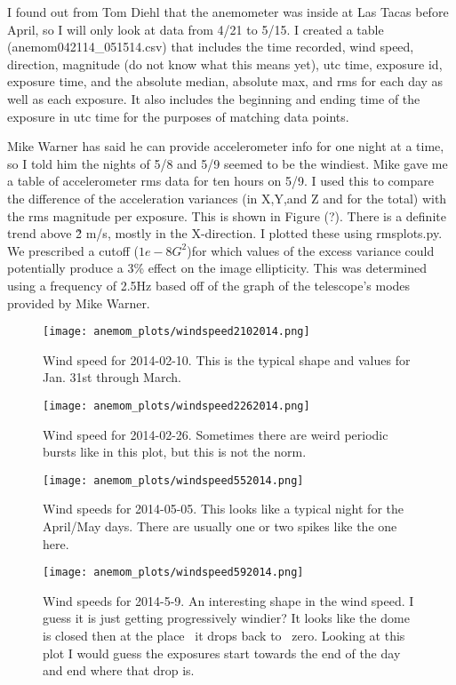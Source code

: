 \documentclass{article}
\begin{document}
I found out from Tom Diehl that the anemometer was inside at Las Tacas before April, so I will only look at data from 4/21 to 5/15. 
I created a table (anemom042114\_051514.csv) that includes the time recorded, wind speed, direction, magnitude (do not know what this means yet), utc time, exposure id, exposure time, and the absolute median, absolute max, and rms for each day as well as each exposure.
 It also includes the beginning and ending time of the exposure in utc time for the purposes of matching data points.

Mike Warner has said he can provide accelerometer info for one night at a time, so I told him the nights of 5/8 and 5/9 seemed to be the windiest. 
Mike gave me a table of accelerometer rms data for ten hours on 5/9. 
I used this to compare the difference of the acceleration variances (in X,Y,and Z and for the total) with the rms magnitude per exposure. 
This is shown in Figure (?). 
There is a definite trend above \~2 m/s, mostly in the X-direction. 
I plotted these using rmsplots.py. 
We prescribed a cutoff ($1e-8 G^{2}$)for which values of the excess variance could potentially produce a 3\% effect on the image ellipticity. 
This was determined using a frequency of 2.5Hz based off of the graph of the telescope's modes provided by Mike Warner.


\begin{figure}[h!]
  \centering
  \texttt{[image: anemom\_plots/windspeed2102014.png]}
  \caption{Wind speed for 2014-02-10. This is the typical shape and values for Jan. 31st through March.}
\end{figure}

\begin{figure}[h!]
  \centering
  \texttt{[image: anemom\_plots/windspeed2262014.png]}
  \caption{Wind speed for 2014-02-26. Sometimes there are weird periodic bursts like in this plot, but this is not the norm.}
\end{figure}

\begin{figure}[h!]
  \centering
  \texttt{[image: anemom\_plots/windspeed552014.png]}
  \caption{Wind speeds for 2014-05-05. This looks like a typical night for the April/May days. There are usually one or two spikes like the one here.}
\end{figure}

\begin{figure}[h!]
  \centering
  \texttt{[image: anemom\_plots/windspeed592014.png]}
  \caption{Wind speeds for 2014-5-9. An interesting shape in the wind speed. I guess it is just getting progressively windier? It looks like the dome is closed then at the place \
it drops back to ~zero. Looking at this plot I would guess the exposures start towards the end of the day and end where that drop is.}
\end{figure}
\end{document}

